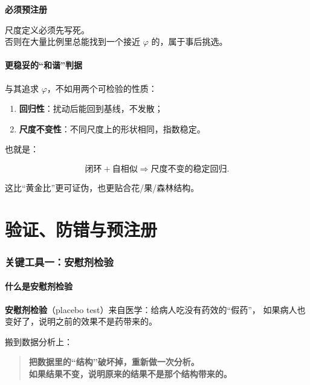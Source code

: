 \documentclass[UTF8,a4paper,11pt]{ctexart}
\newenvironment{explainbox}[1]
{\begin{center}\begin{minipage}{0.94\textwidth}\colorbox{boxbg}{\parbox{0.92\textwidth}{\textbf{#1}\par\vspace{2pt}}}}
{\end{minipage}\end{center}}
\newcommand{\term}[1]{\textbf{#1}}
\begin{document}
\begin{explainbox}{必须预注册}
尺度定义必须先写死。\\
否则在大量比例里总能找到一个接近 $\varphi$ 的，属于事后挑选。
\end{explainbox}

\subsection{更稳妥的“和谐”判据}

与其追求 $\varphi$，不如用两个可检验的性质：

\begin{enumerate}[leftmargin=2em]
\item \textbf{回归性}：扰动后能回到基线，不发散；
\item \textbf{尺度不变性}：不同尺度上的形状相同，指数稳定。
\end{enumerate}

也就是：

\begin{equation}
\text{闭环}+\text{自相似}
\Rightarrow
\text{尺度不变的稳定回归}.
\end{equation}

这比“黄金比”更可证伪，也更贴合花/果/森林结构。

\newpage



\part{验证、防错与预注册}

\section{关键工具一：安慰剂检验}

\subsection{什么是安慰剂检验}

\term{安慰剂检验}（placebo test）来自医学：给病人吃没有药效的“假药”，
如果病人也变好了，说明之前的效果不是药带来的。

搬到数据分析上：

\begin{quote}
\textbf{把数据里的“结构”破坏掉，重新做一次分析。\\
如果结果不变，说明原来的结果不是那个结构带来的。}
\end{quote}
\end{document}
